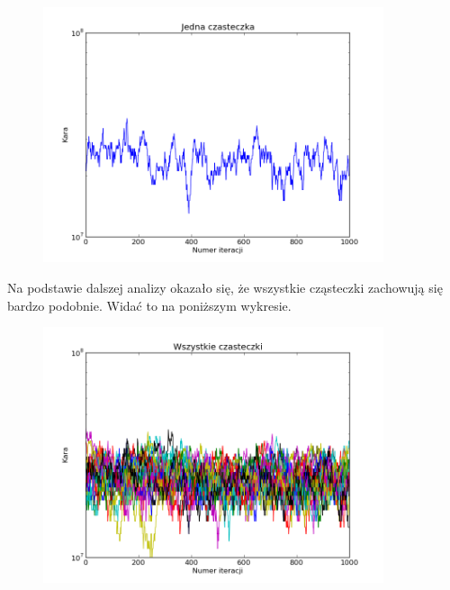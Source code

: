 \begin{figure}[H]
\includegraphics[width=10cm]{img/standard_particle.png}
\centering
\end{figure}
\par Na podstawie dalszej analizy okazało się, że wszystkie cząsteczki zachowują się bardzo podobnie. Widać to na poniższym wykresie.
\begin{figure}[H]
\includegraphics[width=10cm]{img/standard_particle_all.png}
\centering
\end{figure}
